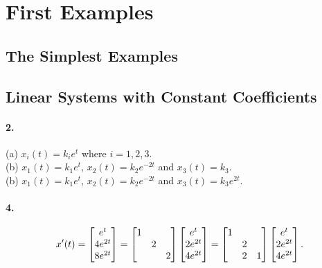 \section{First Examples}

\subsection{The Simplest Examples}

\subsection{Linear Systems with Constant Coefficients}
  \paragraph{2.}
  \begin{solution}
    $\,$ \\
    (a) $x_i(t)=k_i e^t$ where $i=1,2,3$. \\
    (b) $x_1(t)=k_1e^t$, $x_2(t)=k_2e^{-2t}$ and $x_3(t)=k_3$. \\
    (b) $x_1(t)=k_1e^t$, $x_2(t)=k_2e^{-2t}$ and $x_3(t)=k_3e^{2t}$.
  \end{solution}

  \paragraph{4.}
  \begin{solution}
    \[
      x^\prime(t) = 
      \begin{bmatrix}
        e^t \\ 4e^{2t} \\ 8e^{2t}  
      \end{bmatrix} =
      \begin{bmatrix}
        1 &   & \\
          & 2 & \\
          &   & 2 
      \end{bmatrix}
      \begin{bmatrix}
        e^t \\ 2e^{2t} \\ 4e^{2t}  
      \end{bmatrix} =
      \begin{bmatrix}
        1 &   &   \\
          & 2 &   \\
          & 2 & 1 
      \end{bmatrix}
      \begin{bmatrix}
        e^t \\ 2e^{2t} \\ 4e^{2t}  
      \end{bmatrix}.
    \]
  \end{solution}

